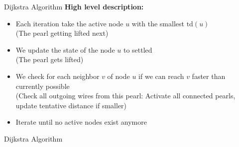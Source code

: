 \begin{frame}{Dijkstra Algorithm}
  \textbf{High level description:}
  \begin{itemize}
    \item
      Each iteration take the {\color{MainA}active} node
      {\color{MainA}$u$} with the
      {\color{MainA}smallest $\mathrm{td}(u)$}\\
      {\color{gray}(The pearl getting lifted next)}
    \item
      We update the state of the node {\color{MainA}$u$} to
      {\color{MainA}settled}\\
      {\color{gray}(The pearl gets lifted)}
    \item
      We check for each {\color{MainA}neighbor $v$} of node
      {\color{MainA}$u$} if we can reach {\color{MainA}$v$} faster
      than currently possible\\
      {\color{gray}(Check all outgoing wires from this pearl:
        Activate all connected pearls, update
        tentative distance if smaller)}
    \item
      Iterate until no active nodes exist anymore
  \end{itemize}
\end{frame}


\begin{frame}{Dijkstra Algorithm}
  \vspace{-1em}
  \begin{figure}[!h]
    \begin{adjustbox}{width=\linewidth}
      \def\DijkstraReverse{0}%
      
    \end{adjustbox}
    \vspace{-2em}
    \caption{%
    }
  \end{figure}
\end{frame}


